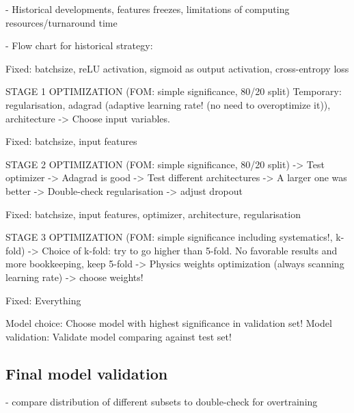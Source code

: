- Historical developments, features freezes, limitations of computing resources/turnaround time

- Flow chart for historical strategy:

Fixed: batchsize, reLU activation, sigmoid as output activation, cross-entropy loss

STAGE 1 OPTIMIZATION (FOM: simple significance, 80/20 split)
Temporary: regularisation, adagrad (adaptive learning rate! (no need to overoptimize it)), architecture
-> Choose input variables. 

Fixed: batchsize, input features

STAGE 2 OPTIMIZATION (FOM: simple significance, 80/20 split)
-> Test optimizer -> Adagrad is good
-> Test different architectures -> A larger one was better
-> Double-check regularisation -> adjust dropout

Fixed: batchsize, input features, optimizer, architecture, regularisation

STAGE 3 OPTIMIZATION (FOM: simple significance including systematics!, k-fold)
-> Choice of k-fold: try to go higher than 5-fold. No favorable results and more bookkeeping, keep 5-fold
-> Physics weights optimization (always scanning learning rate) -> choose weights!

Fixed: Everything


Model choice: Choose model with highest significance in validation set!
Model validation: Validate model comparing against test set!




\subsection{Final model validation}
- compare distribution of different subsets to double-check for overtraining
